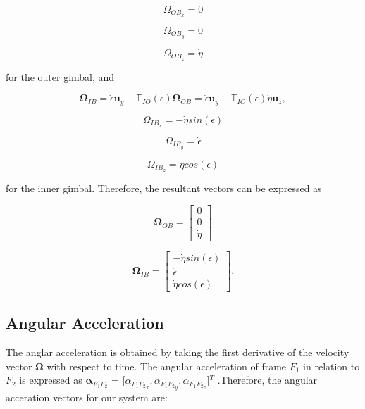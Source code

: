\begin{equation}
   \label{equacaoOB}
   \Omega_{OB_x} = 0
\end{equation}

\begin{equation}
   \Omega_{OB_y} = 0
\end{equation}

\begin{equation}
   \Omega_{OB_z} = \dot \eta
\end{equation}

for the outer gimbal, and

\begin{equation}
   \mathbf{\Omega}_{IB} = \dot \epsilon \mathbf{u}_y + \mathbb{T}_{IO}(\epsilon)  \mathbf{\Omega}_{OB} = \dot \epsilon \mathbf{u}_y + \mathbb{T}_{IO}(\epsilon)  \dot \eta \mathbf{u}_z,
\end{equation}

\begin{equation}
   \Omega_{IB_x} = -\dot \eta sin(\epsilon)
\end{equation}

\begin{equation}
   \Omega_{IB_y} = \dot \epsilon
\end{equation}

\begin{equation}
   \label{equacaoIB}
   \Omega_{IB_z} = \dot \eta cos(\epsilon)
\end{equation}

for the inner gimbal. Therefore, the resultant vectors can be expressed as

 \begin{equation}
    \mathbf{\Omega}_{OB} = \left[\begin{matrix} 0 \\ 0 \\ \dot \eta \end{matrix}\right]
 \end{equation}

 \begin{equation}
    \mathbf{\Omega}_{IB} = \left[\begin{matrix} -\dot \eta sin(\epsilon) \\ \dot \epsilon \\ \dot \eta cos(\epsilon) \end{matrix}\right].
 \end{equation}

 \subsection{Angular Acceleration}
The anglar acceleration is obtained by taking the first derivative of the velocity vector $\mathbf{\Omega}$ with respect to time. The angular acceleration of frame $F_1$ in relation to $F_2$ is expressed as $\bm{\alpha}_{F_1 F_2}$ = $[\alpha_{{F_1 F_2}_x}, \alpha_{{F_1 F_2}_y}, \alpha_{{F_1 F_2}_z}$]$^T$ .Therefore, the angular acceration vectors for our system are:


